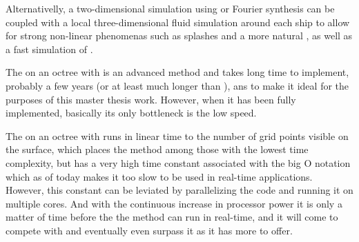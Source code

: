 Alternativelly, a two-dimensional simulation using \LPD or Fourier synthesis can be coupled with a local three-dimensional fluid simulation around each ship to allow for strong non-linear phenomenas such as splashes and a more natural \FSI, as well as a fast simulation of .

The \FVM on an octree with \FSM is an advanced method and takes long time to implement, probably a few years (or at least much longer than \masterthesisworktime), ans to make it ideal for the purposes of this master thesis work. However, when it has been fully implemented, basically its only bottleneck is the low speed.

The \FVM on an octree with \FSM runs in linear time to the number of grid points visible on the surface, which places the method among those with the lowest time complexity, but has a very high time constant associated with the big O notation which as of today makes it too slow to be used in real-time applications. However, this constant can be leviated by parallelizing the code and running it on multiple cores. And with the continuous increase in processor power it is only a matter of time before the the method can run in real-time, and it will come to compete with \LPD and eventually even surpass it as it has more to offer.